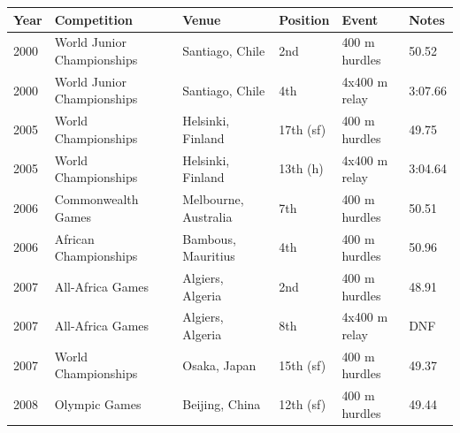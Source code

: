 \documentclass{article}
\begin{document}
\begin{tabular}{llllll}
\toprule
Year & Competition & Venue & Position & Event & Notes \\
\midrule
2000 & World Junior Championships & Santiago, Chile & 2nd & 400 m hurdles & 50.52 \\
2000 & World Junior Championships & Santiago, Chile & 4th & 4x400 m relay & 3:07.66 \\
2005 & World Championships & Helsinki, Finland & 17th (sf) & 400 m hurdles & 49.75 \\
2005 & World Championships & Helsinki, Finland & 13th (h) & 4x400 m relay & 3:04.64 \\
2006 & Commonwealth Games & Melbourne, Australia & 7th & 400 m hurdles & 50.51 \\
2006 & African Championships & Bambous, Mauritius & 4th & 400 m hurdles & 50.96 \\
2007 & All-Africa Games & Algiers, Algeria & 2nd & 400 m hurdles & 48.91 \\
2007 & All-Africa Games & Algiers, Algeria & 8th & 4x400 m relay & DNF \\
2007 & World Championships & Osaka, Japan & 15th (sf) & 400 m hurdles & 49.37 \\
2008 & Olympic Games & Beijing, China & 12th (sf) & 400 m hurdles & 49.44 \\
\bottomrule
\end{tabular}
\end{document}
